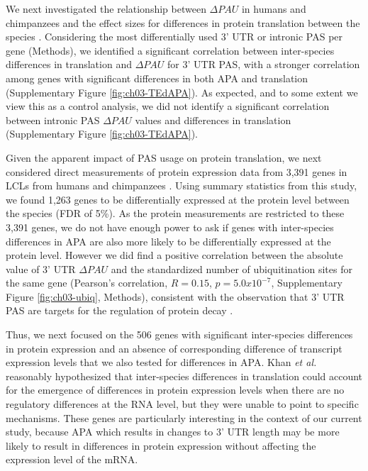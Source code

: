We next investigated the relationship between $\Delta PAU$ in humans and chimpanzees and the effect sizes for differences in protein translation between the species \citep{wang_post-translational_2018}. Considering the most differentially used 3' UTR or intronic PAS per gene (Methods), we identified a significant correlation between inter-species differences in translation and $\Delta PAU$ for 3' UTR PAS, with a stronger correlation among genes with significant differences in both APA and translation (Supplementary Figure \ref{fig:ch03-TEdAPA}). As expected, and to some extent we view this as a control analysis, we did not identify a significant correlation between intronic PAS $\Delta PAU$ values and differences in translation (Supplementary Figure \ref{fig:ch03-TEdAPA}). 

Given the apparent impact of PAS usage on protein translation, we next considered direct measurements of protein expression data from 3,391 genes in LCLs from humans and chimpanzees \citep{khan_primate_2013}. Using summary statistics from this study, we found 1,263 genes to be differentially expressed at the protein level between the species (FDR of 5\%). As the protein measurements are restricted to these 3,391 genes, we do not have enough power to ask if genes with inter-species differences in APA are also more likely to be differentially expressed at the protein level. However we did find a positive correlation between the absolute value of 3' UTR $\Delta PAU$ and the standardized number of ubiquitination sites for the same gene (Pearson's correlation, $R=0.15$, $p=5.0x10^{-7}$, Supplementary Figure \ref{fig:ch03-ubiq}, Methods), consistent with the observation that 3' UTR PAS are targets for the regulation of protein decay \citep{dubnikov_protein_2017, ravid_diversity_2008}.

Thus, we next focused on the 506  genes with significant inter-species differences in protein expression and an absence of corresponding difference of transcript expression levels that we also tested for differences in APA. Khan \emph{et al.} reasonably hypothesized that inter-species differences in translation could account for the emergence of differences in protein expression levels when there are no regulatory differences at the RNA level, but they were unable to point to specific mechanisms. These genes are particularly interesting in the context of our current study, because APA which results in changes to 3' UTR length may be more likely to result in differences in protein expression without affecting the expression level of the mRNA. 

